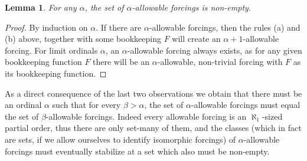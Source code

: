 \documentclass[a4paper,11pt]{article}
\newtheorem{lemma}[theorem]{Lemma}
\begin{document}
\begin{lemma}
For any $\alpha$, the set of $\alpha$-allowable forcings is non-empty.
\end{lemma}
\begin{proof}
By induction on $\alpha$. If there are $\alpha$-allowable forcings, then the rules (a) and (b) above, together with some bookkeeping $F$ will create an $\alpha+1$-allowable forcing. For limit ordinals $\alpha$, an $\alpha$-allowable forcing always exists, as for any given bookkeeping function $F$ there will be an $\alpha$-allowable, non-trivial forcing with $F$ as its bookkeeping function. 
\end{proof}

As a direct consequence of the last two observations we obtain that there must be an ordinal $\alpha$ such that for every $\beta> \alpha$, the set of $\alpha$-allowable forcings must equal the set of $\beta$-allowable forcings. Indeed every allowable forcing is an $\aleph_1$-sized partial order, thus there are only set-many of them, and the classes (which in fact are sets, if we allow ourselves to identify isomorphic forcings) of $\alpha$-allowable forcings must eventually stabilize at a set which also must be non-empty.
\end{document}
